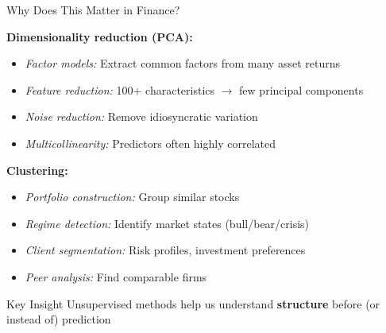 \documentclass[10pt]{beamer}
\newcommand{\highlight}[1]{\textcolor{AccentOrange}{\textbf{#1}}}
\begin{document}
\begin{frame}{Why Does This Matter in Finance?}

  \textbf{Dimensionality reduction (PCA):}
  \begin{itemize}
    \item \textit{Factor models:} Extract common factors from many asset returns
    \item \textit{Feature reduction:} 100+ characteristics $\to$ few principal components
    \item \textit{Noise reduction:} Remove idiosyncratic variation
    \item \textit{Multicollinearity:} Predictors often highly correlated
  \end{itemize}

  \vspace{1em}
  \textbf{Clustering:}
  \begin{itemize}
    \item \textit{Portfolio construction:} Group similar stocks
    \item \textit{Regime detection:} Identify market states (bull/bear/crisis)
    \item \textit{Client segmentation:} Risk profiles, investment preferences
    \item \textit{Peer analysis:} Find comparable firms
  \end{itemize}

  \vspace{0.5em}
  \begin{block}{Key Insight}
    Unsupervised methods help us understand \highlight{structure} before (or instead of) prediction
  \end{block}
\end{frame}

\end{document}
